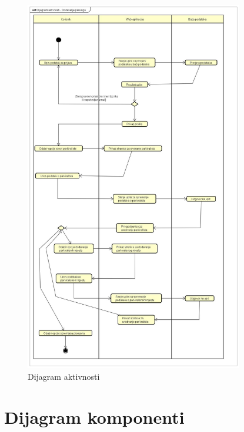 \begin{figure}[H]
	
	\includegraphics[width=0.85\textwidth]{slike/Dijagram aktivnosti - Dodavanje parkinga.jpg} %
	\centering
	\caption{Dijagram aktivnosti}
	\label{fig:dijaktiv}
\end{figure}

\eject
\section{Dijagram komponenti}

